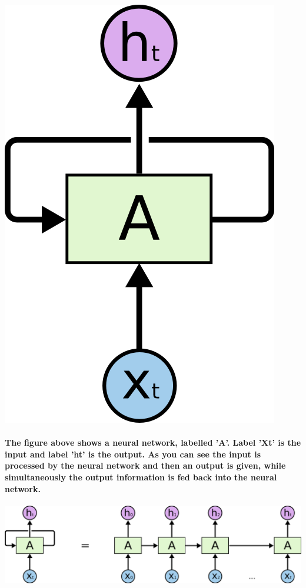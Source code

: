 \begin{center}    
    \includegraphics[scale=0.5]{img/RNN_diagram.png}
\end{center}

\paragraph{The figure above shows a neural network, labelled 'A'. Label 'Xt' is the input and label 'ht' is the output. As you can see the input is processed by the neural network and then an output is given, while simultaneously the output information is fed back into the neural network.}

\begin{center}    
    \includegraphics[scale=0.4]{img/RNN_expanded.png}
\end{center}

